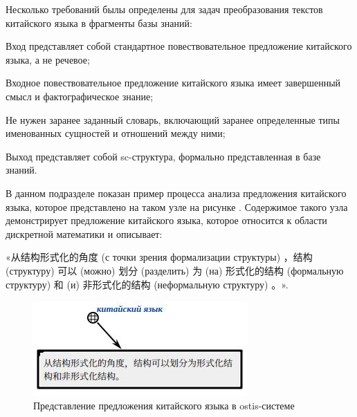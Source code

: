 Несколько требований былы определены для задач преобразования текстов китайского языка в фрагменты базы знаний:
\begin{textitemize}
	\item Вход представляет собой стандартное повествовательное предложение китайского языка, а не речевое;
	\item Входное повествовательное предложение китайского языка имеет завершенный смысл и фактографическое знание;
	\item Не нужен заранее заданный словарь, включающий заранее определенные типы именованных сущностей и отношений между ними;
	\item Выход представляет собой sc-структура, формально представленная в базе знаний.
\end{textitemize}

В данном подразделе показан пример процесса анализа предложения китайского языка, которое представлено на таком узле на рисунке \textit{}. Содержимое такого узла демонстрирует предложение китайского языка, которое относится к области дискретной математики и описывает: \begin{CJK}{UTF8}{gbsn}«从结构形式化的角度 (с точки зрения формализации структуры) ，结构(структуру) 可以 (можно) 划分 (разделить) 为 (на) 形式化的结构 (формальную структуру) 和 (и) 非形式化的结构 (неформальную структуру) 。». \end{CJK}
\begin{figure}[H]
	\centering
	\includegraphics[scale=0.8]{images/part4/chapter_chinese/chinese_sentence.png}
	\caption{Представление предложения китайского языка в ostis-системе}
	\label{fig:chinese-sentence-sc}
\end{figure}

